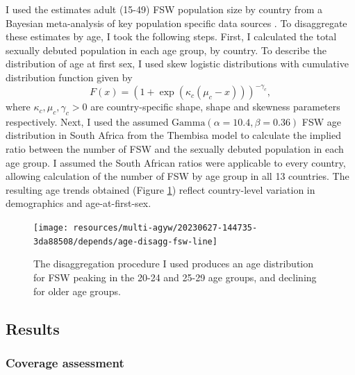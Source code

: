 \documentclass[a4paper, nobind]{templates/ociamthesis}
\begin{document}
I used the estimates adult (15-49) FSW population size by country from a Bayesian meta-analysis of key population specific data sources \autocite{stevens2022estimating}.
To disaggregate these estimates by age, I took the following steps.
First, I calculated the total sexually debuted population in each age group, by country.
To describe the distribution of age at first sex, I used skew logistic distributions \autocite{nguyen2022trends} with cumulative distribution function given by
\begin{equation}
F(x) = \left(1 + \exp(\kappa_c (\mu_c - x)) \right)^{- \gamma_c},
\end{equation}
where \(\kappa_c, \mu_c, \gamma_c > 0\) are country-specific shape, shape and skewness parameters respectively.
Next, I used the assumed \(\text{Gamma}(\alpha = 10.4, \beta = 0.36)\) FSW age distribution in South Africa from the Thembisa model \autocite{johnson2020thembisa} to calculate the implied ratio between the number of FSW and the sexually debuted population in each age group.
I assumed the South African ratios were applicable to every country, allowing calculation of the number of FSW by age group in all 13 countries.
The resulting age trends obtained (Figure \ref{fig:age-disagg-fsw-line}) reflect country-level variation in demographics and age-at-first-sex.



\begin{figure}
\texttt{[image: resources/multi-agyw/20230627-144735-3da88508/depends/age-disagg-fsw-line]} \caption{The disaggregation procedure I used produces an age distribution for FSW peaking in the 20-24 and 25-29 age groups, and declining for older age groups.}\label{fig:age-disagg-fsw-line}
\end{figure}

\hypertarget{results}{%
\subsection{Results}\label{results}}

\hypertarget{coverage-assessment}{%
\subsubsection{Coverage assessment}\label{coverage-assessment}}
\end{document}
